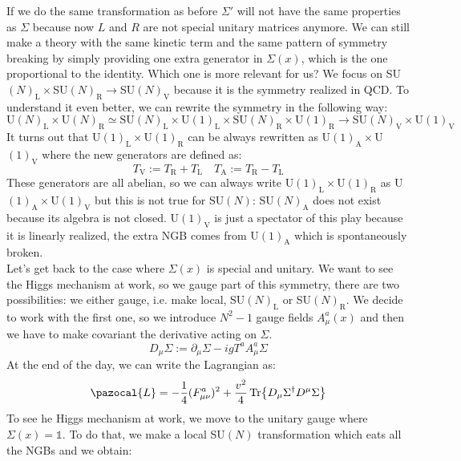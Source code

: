 \documentclass[../main.tex]{subfiles}
\begin{document}
If we do the same transformation as before $\Sigma'$ will not have the same properties as $\Sigma$ because now $L$ and $R$ are not special unitary matrices anymore. We can still make a theory with the same kinetic term and the same pattern of symmetry breaking by simply providing one extra generator in $\Sigma(x)$, which is the one proportional to the identity. Which one is more relevant for us? We focus on SU$(N)_{\text{L}}\times$SU$(N)_{\text{R}}\to$SU$(N)_{\text{V}}$ because it is the symmetry realized in QCD. To understand it even better, we can rewrite the symmetry in the following way:
\[
\text{U}(N)_{\text{L}}\times\text{U}(N)_{\text{R}}\simeq\text{SU}(N)_{\text{L}}\times\text{U}(1)_{\text{L}}\times\text{SU}(N)_{\text{R}}\times\text{U}(1)_{\text{R}}\to\text{SU}(N)_{\text{V}}\times\text{U}(1)_{\text{V}}
\]
It turns out that U$(1)_{\text{L}}\times$U$(1)_{\text{R}}$ can be always rewritten as U$(1)_{\text{A}}\times$U$(1)_{\text{V}}$ where the new generators are defined as:
\[
T_{\text{V}}:=T_{\text{R}}+T_{\text{L}} \quad T_{\text{A}}:=T_{\text{R}}-T_{\text{L}}
\]
These generators are all abelian, so we can always write U$(1)_{\text{L}}\times$U$(1)_{\text{R}}$ as U$(1)_{\text{A}}\times$U$(1)_{\text{V}}$ but this is not true for SU$(N)$: SU$(N)_{\text{A}}$ does not exist because its algebra is not closed. U$(1)_{\text{V}}$ is just a spectator of this play because it is linearly realized, the extra NGB comes from U$(1)_{\text{A}}$ which is spontaneously broken.\\
Let's get back to the case where $\Sigma(x)$ is special and unitary. We want to see the Higgs mechanism at work, so we gauge part of this symmetry, there are two possibilities: we either gauge, i.e. make local, SU$(N)_{\text{L}}$ or SU$(N)_{\text{R}}$. We decide to work with the first one, so we introduce $N^2-1$ gauge fields $A_\mu^a(x)$ and then we have to make covariant the derivative acting on $\Sigma$.
\[
D_\mu\Sigma:=\partial_\mu\Sigma-igT^aA_\mu^a\Sigma
\]
At the end of the day, we can write the Lagrangian as:
\[
\pazocal{L}=-\frac{1}{4}(F_{\mu\nu}^a)^2+\frac{v^2}{4}\Tr{D_\mu\Sigma^\dagger D^\mu\Sigma}
\]
To see he Higgs mechanism at work, we move to the unitary gauge where $\Sigma(x)=\mathbb{1}$. To do that, we make a local SU$(N)$ transformation which eats all the NGBs and we obtain:
\end{document}
